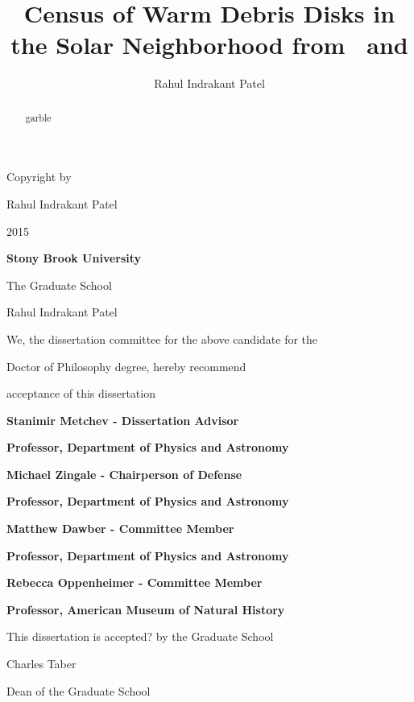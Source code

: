 \documentclass[phd,bottom,nosig]{usbthesis}
\author{Rahul Indrakant Patel}%
\title{Census of  Warm Debris Disks in the Solar Neighborhood from \WS\ and \hip}%
\begin{document}
\singlespacing %

\maketitle %


\newpage
{}

\vspace*{32\baselineskip}
\vspace*{1\baselineskip}
\centerline{Copyright by}
\centerline{Rahul Indrakant Patel}
\centerline{2015}


\newpage
{}
\setcounter{page}{2}

\centerline{\bf{Stony Brook University}}
\vspace*{1\baselineskip}
\centerline{The Graduate School}
\vspace*{2\baselineskip}
\centerline{Rahul Indrakant Patel}
\vspace*{2\baselineskip}
\centerline{We, the dissertation committee for the above candidate for the}
\vspace*{1\baselineskip}
\centerline{Doctor of Philosophy degree, hereby recommend}
\vspace*{1\baselineskip}
\centerline{acceptance of this dissertation}
\vspace*{2\baselineskip}
\centerline{\bf{Stanimir Metchev - Dissertation Advisor}}
\centerline{\bf{Professor, Department of Physics and Astronomy}}
\vspace*{1\baselineskip}
\centerline{\bf{Michael Zingale - Chairperson of Defense}}
\centerline{\bf{Professor, Department of Physics and Astronomy}}
\vspace*{1\baselineskip}
\centerline{\bf{Matthew Dawber - Committee Member}}
\centerline{\bf{Professor, Department of Physics and Astronomy}}
\vspace*{1\baselineskip}
\centerline{\bf{Rebecca Oppenheimer - Committee Member}}
\centerline{\bf{Professor, American Museum of Natural History}}
\vspace*{2\baselineskip}
\centerline{This dissertation is accepted? by the Graduate School}
\vspace*{3\baselineskip}
\centerline{Charles Taber}
\centerline{Dean of the Graduate School}

\newpage

\begin{abstract}
    garble%
\end{abstract}
\end{document}
